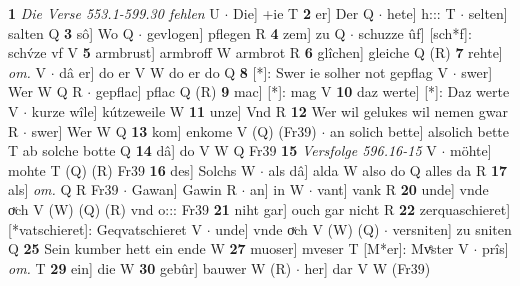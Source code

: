 \documentclass[8pt,a4paper,notitlepage]{article}
\begin{document}
\begin{table}[ht]
\begin{minipage}[t]{0.5\linewidth}
\textbf{1} \textit{Die Verse 553.1-599.30 fehlen} U   $\cdot$ Die] +ie T \textbf{2} er] Der Q  $\cdot$ hete] h::: T  $\cdot$ selten] salten Q \textbf{3} sô] Wo Q  $\cdot$ gevlogen] pflegen R \textbf{4} zem] zu Q  $\cdot$ schuzze ûf] [sch*f]: schv́ze vf V \textbf{5} armbrust] armbroff W armbrot R \textbf{6} glîchen] gleiche Q (R) \textbf{7} rehte] \textit{om.} V  $\cdot$ dâ er] do er V W do er do Q \textbf{8} [*]: Swer ie solher not gepflag V  $\cdot$ swer] Wer W Q R  $\cdot$ gepflac] pflac Q (R) \textbf{9} mac] [*]: mag V \textbf{10} daz werte] [*]: Daz werte V  $\cdot$ kurze wîle] kútzeweile W \textbf{11} unze] Vnd R \textbf{12} Wer wil gelukes wil nemen gwar R  $\cdot$ swer] Wer W Q \textbf{13} kom] enkome V (Q) (Fr39)  $\cdot$ an solich bette] alsolich bette T ab solche botte Q \textbf{14} dâ] do V W Q Fr39 \textbf{15} \textit{Versfolge 596.16-15} V   $\cdot$ möhte] mohte T (Q) (R) Fr39 \textbf{16} des] Solchs W  $\cdot$ als dâ] alda W also do Q alles da R \textbf{17} als] \textit{om.} Q R Fr39  $\cdot$ Gawan] Gawin R  $\cdot$ an] in W  $\cdot$ vant] vank R \textbf{20} unde] vnde oͮch V (W) (Q) (R) vnd o::: Fr39 \textbf{21} niht gar] ouch gar nicht R \textbf{22} zerquaschieret] [*vatschieret]: Geqvatschieret V  $\cdot$ unde] vnde oͮch V (W) (Q)  $\cdot$ versniten] zu sniten Q \textbf{25} Sein kumber hett ein ende W \textbf{27} muoser] mveser T [M*er]: Mvͤster V  $\cdot$ prîs] \textit{om.} T \textbf{29} ein] die W \textbf{30} gebûr] bauwer W (R)  $\cdot$ her] dar V W (Fr39) \newline
\end{minipage}
\end{table}
\end{document}
